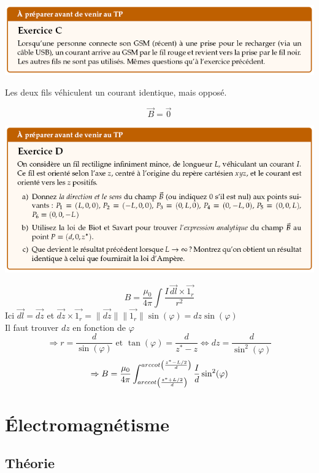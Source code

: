 \documentclass	[11pt, a4paper, openany]{book}
\begin{document}
		
		
		
		\newpage
		\begin{center}
			\includegraphics[scale=0.85]{prepa/magneto3.png}\\
		\end{center}
		\begin{center}
			Les deux fils véhiculent un courant identique, mais opposé.
		\end{center}
		$$\vec{B} = \vec{0}$$
		
		\begin{center}
			\includegraphics[scale=0.85]{prepa/magneto4.png}\\
		\end{center}
		$$B=\frac{\mu_0}{4\pi}\int \frac{I\,\vec{dl}\times\vec{1_r}}{r^2}$$Ici $\vec{dl}=\vec{dz}$ et $\vec{dz}\times\vec{1_r}=\|\vec{dz}\| \|\vec{1_r}\|\sin(\varphi)=dz\sin(\varphi)$\\
		Il faut trouver $dz$ en fonction de $\varphi$  $$\Rightarrow r=\frac{d}{\sin(\varphi)}\text{ et } \tan(\varphi)=\frac{d}{z^*-z}\Leftrightarrow dz=\frac{d}{\sin^2(\varphi)}$$
		$$\Rightarrow B = \frac{\mu_0}{4\pi}\int_{arccot\left(\frac{z^*+L/2}{d}\right)}^{arccot\left(\frac{z^*-L/2}{d}\right)}\frac{I}{d}\sin^2(\varphi)$$
				
		
		
		\newpage
		\section{Électromagnétisme}
		\subsection{Théorie}
		
\end{document}

